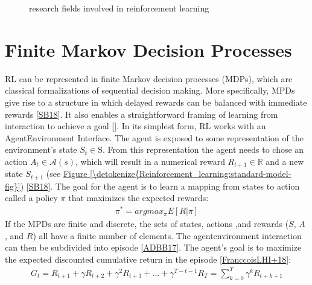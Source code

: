 \documentclass[letterpaper,10pt,english]{jupyterBook}
\let\sphinxpxdimen\pdfpxdimen\else\newdimen\sphinxpxdimen
\begin{document}
\begin{figure}[htbp]
\centering
\capstart

\noindent\sphinxincludegraphics[width=600\sphinxpxdimen,height=250\sphinxpxdimen]{{tree}.png}
\caption{research fields involved in reinforcement learning}\label{\detokenize{Reinforcement_learning:tree-fig}}\end{figure}


\section{Finite Markov Decision Processes}
\label{\detokenize{Reinforcement_learning:finite-markov-decision-processes}}
\sphinxAtStartPar
RL can be represented in finite Markov decision processes (MDPs), which are classical formalizations of sequential decision making. More specifically, MPDs give rise to a structure in which delayed rewards can be balanced with immediate rewards {[}\hyperlink{cite.Discussion:id57}{SB18}{]}. It also enables a straightforward framing of learning from interaction to achieve a goal {[}{]}. In its simplest form, RL works with an Agent\sphinxhyphen{}Environment Interface. The agent is exposed to some representation of the environment’s state \(S_t \in \mathrm{S}\). From this representation the agent needs to chose an action \( A_t \in \mathcal{A}(s)\), which will result in a numerical reward \(R_{t+1} \in 	\mathbb{R} \) and a new state \(S_{t+1}\) (see \hyperref[\detokenize{Reinforcement_learning:standard-model-fig}]{Figure \ref{\detokenize{Reinforcement_learning:standard-model-fig}}})  {[}\hyperlink{cite.Discussion:id57}{SB18}{]}. The goal for the agent is to learn a mapping from states to action called a policy \(\pi\) that maximizes the expected rewards:
\begin{equation*}
\begin{split} \pi^* = argmax_{\pi} E[R|\pi] \end{split}
\end{equation*}
\sphinxAtStartPar
If the MPDs are finite and discrete, the sets of states, actions ,and rewards (\(S\), \(A\) , and \(R\)) all have a finite number of elements. The agent\sphinxhyphen{}environment interaction can then be subdivided into episode {[}\hyperlink{cite.Discussion:id50}{ADBB17}{]}.  The agent’s goal is to maximize the expected discounted cumulative return in the episode {[}\hyperlink{cite.Discussion:id59}{FranccoisLHI+18}{]}:
\begin{equation}\label{equation:Reinforcement_learning:return}
\begin{split}G_t = R_{t+1} + \gamma R_{t+2} + \gamma^2 R_{t+3} + ... + \gamma^{T-t-1}R_T = \sum_{k=0}^T \gamma^k R_{t+k+1}\end{split}
\end{equation}
\end{document}
